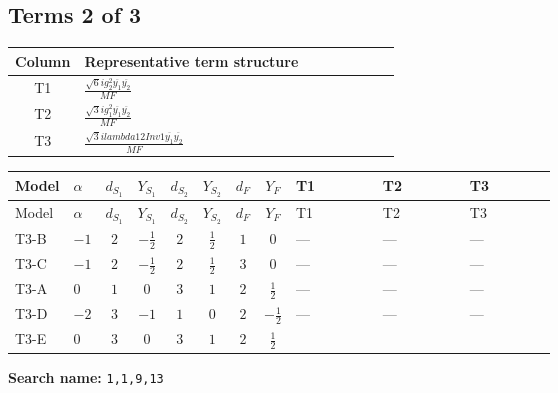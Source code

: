 \documentclass[8pt]{article}
\begin{document}
\begin{landscape}
\subsection*{Terms 2 of 3}
\begin{center}
\begin{tabular}{@{}c >{\raggedright\arraybackslash}p{0.82\linewidth}@{}}
\toprule
Column & Representative term structure \\
\midrule
T1 & \(\displaystyle \frac{\sqrt{6} i g_{2}^{2} \overline{y_{1}} \overline{y_{2}}}{MF}\) \\
\midrule
T2 & \(\displaystyle \frac{\sqrt{3} i g_{1}^{2} \overline{y_{1}} \overline{y_{2}}}{MF}\) \\
\midrule
T3 & \(\displaystyle \frac{\sqrt{3} i lambda12Inv1 \overline{y_{1}} \overline{y_{2}}}{MF}\) \\
\midrule
\bottomrule
\end{tabular}
\end{center}
\smallskip
\tiny
\begin{longtable}{@{}llcccccc >{\raggedright\arraybackslash}p{0.21\linewidth} >{\raggedright\arraybackslash}p{0.21\linewidth} >{\raggedright\arraybackslash}p{0.21\linewidth}@{}}
\toprule
Model & $\alpha$ & $d_{S_1}$ & $Y_{S_1}$ & $d_{S_2}$ & $Y_{S_2}$ & $d_F$ & $Y_F$ & T1 & T2 & T3 \\
\midrule
\endfirsthead
\toprule
Model & $\alpha$ & $d_{S_1}$ & $Y_{S_1}$ & $d_{S_2}$ & $Y_{S_2}$ & $d_F$ & $Y_F$ & T1 & T2 & T3 \\
\midrule
\endhead
T3-B & $-1$ & $2$ & $-\frac{1}{2}$ & $2$ & $\frac{1}{2}$ & $1$ & $0$ & --- & --- & --- \\
\midrule
T3-C & $-1$ & $2$ & $-\frac{1}{2}$ & $2$ & $\frac{1}{2}$ & $3$ & $0$ & --- & --- & --- \\
\midrule
T3-A & $0$ & $1$ & $0$ & $3$ & $1$ & $2$ & $\frac{1}{2}$ & --- & --- & --- \\
\midrule
T3-D & $-2$ & $3$ & $-1$ & $1$ & $0$ & $2$ & $-\frac{1}{2}$ & --- & --- & --- \\
\midrule
T3-E & $0$ & $3$ & $0$ & $3$ & $1$ & $2$ & $\frac{1}{2}$ & \scriptsize\adjustbox{max width=\linewidth}{$\begin{gathered} - \frac{\sqrt{6} i g_{2}^{2} \overline{y_{1}} \overline{y_{2}}}{3 MF}\end{gathered}$} & \scriptsize\adjustbox{max width=\linewidth}{$\begin{gathered} - \frac{\sqrt{3} i g_{1}^{2} \overline{y_{1}} \overline{y_{2}}}{8 MF}\end{gathered}$} & \scriptsize\adjustbox{max width=\linewidth}{$\begin{gathered} \frac{\sqrt{3} i lambda12Inv1 \overline{y_{1}} \overline{y_{2}}}{6 MF}\end{gathered}$} \\
\midrule
\bottomrule
\end{longtable}
\clearpage
\noindent\textbf{Search name: }\texttt{1,1,9,13}\par\smallskip

\end{landscape}
\end{document}
